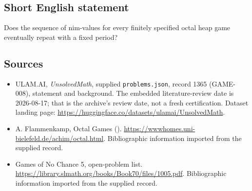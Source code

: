 \documentclass[11pt,a4paper]{article}
\begin{document}
\subsection{Short English statement}

Does the sequence of nim-values for every finitely specified octal heap game eventually repeat with a fixed period?

\subsection{Sources}

{\small

\begin{itemize}

\item[\hypertarget{source:1365:1}{S1}] ULAM.AI, \emph{UnsolvedMath}, supplied \texttt{problems.json}, record 1365 (GAME-008), statement and background. The embedded literature-review date is 2026-08-17; that is the archive’s review date, not a fresh certification. Dataset landing page: \url{https://huggingface.co/datasets/ulamai/UnsolvedMath}.

\item[\hypertarget{source:1365:2}{S2}] A. Flammenkamp, Octal Games (). \url{https://wwwhomes.uni-bielefeld.de/achim/octal.html}. Bibliographic information imported from the supplied record.

\item[\hypertarget{source:1365:3}{S3}] Games of No Chance 5, open-problem list. \url{https://library.slmath.org/books/Book70/files/1005.pdf}. Bibliographic information imported from the supplied record.

\end{itemize}

}

\label{end:1365}
\end{document}
